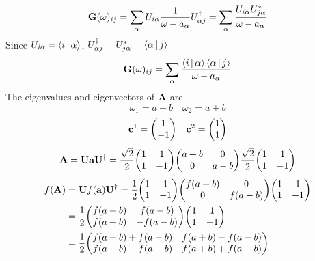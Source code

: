 \documentclass[a4paper]{article}
\begin{document}
\begin{equation}\label{key}
\vb{G}(\omega)_{ij} = \sum_\alpha U_{i\alpha}\dfrac{1}{\omega-a_\alpha}U^\dagger_{\alpha j} = \sum_\alpha \dfrac{U_{i\alpha}U_{j\alpha}^*}{\omega-a_\alpha}
\end{equation}
Since $U_{i\alpha} = \Braket{i | \alpha}  $, $ U^\dagger_{\alpha j} = U_{j\alpha}^* = \Braket{\alpha | j} $
\begin{equation}\label{key}
\vb{G}(\omega)_{ij} = \sum_\alpha \dfrac{\Braket{i | \alpha} \Braket{\alpha | j}}{\omega-a_\alpha}
\end{equation}
The eigenvalues and eigenvectors of $ \vb{A} $ are
\begin{equation}\label{key}
\omega_1 = a-b \quad \omega_2 = a+b
\end{equation}
\begin{equation}\label{key}
\vb{c}^1 = \mqty(1\\ -1) \quad \vb{c}^2 = \mqty(1\\ 1)
\end{equation}
\begin{equation}\label{key}
\vb{A} = \vb{U}\vb{a}\vb{U}^\dagger 
=\dfrac{\sqrt{2}}{2}\mqty(1 & 1\\1 & -1)\mqty(a+b & 0\\0 & a-b) \dfrac{\sqrt{2}}{2}\mqty(1 & 1\\1 & -1)
\end{equation}
\begin{equation}\label{key}
\begin{aligned}
f(\vb{A}) &= \vb{U}f(\vb{a})\vb{U}^\dagger = \dfrac{1}{2}\mqty(1 & 1\\1 & -1) \mqty(f(a+b) & 0\\0 & f(a-b)) \mqty(1 & 1\\1 & -1)\\
&= \dfrac{1}{2}\mqty(f(a+b) & f(a-b)\\ f(a+b) & -f(a-b)) \mqty(1 & 1\\1 & -1)\\
&= \dfrac{1}{2}\mqty(f(a+b)+f(a-b) & f(a+b)-f(a-b) \\ f(a+b)-f(a-b) & f(a+b)+f(a-b) )
\end{aligned}
\end{equation}
\end{document}
